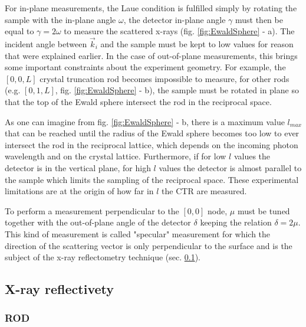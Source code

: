 For in-plane measurements, the Laue condition is fulfilled simply by rotating the sample with the in-plane angle $\omega$, the detector in-plane angle $\gamma$ must then be equal to $\gamma = 2 \omega$ to measure the scattered x-rays (fig. \ref{fig:EwaldSphere} - a).
The incident angle between $\vec{k}_i$ and the sample must be kept to low values for reason that were explained earlier.
In the case of out-of-plane measurements, this brings some important constraints about the experiment geometry.
For example, the $[0, 0, L]$ crystal truncation rod becomes impossible to measure, for other rods (e.g. $[0, 1, L]$, fig. \ref{fig:EwaldSphere} - b), the sample must be rotated in plane so that the top of the Ewald sphere intersect the rod in the reciprocal space.

As one can imagine from fig. \ref{fig:EwaldSphere} - b, there is a maximum value $l_{max}$ that can be reached until the radius of the Ewald sphere becomes too low to ever intersect the rod in the reciprocal lattice, which depends on the incoming photon wavelength and on the crystal lattice.
Furthermore, if for low $l$ values the detector is in the vertical plane, for high $l$ values the detector is almost parallel to the sample which limits the sampling of the reciprocal space.
These experimental limitations are at the origin of how far in $l$ the CTR are measured.

To perform a measurement perpendicular to the $[0, 0]$ node, $\mu$ must be tuned together with the out-of-plane angle of the detector $\delta$ keeping the relation $\delta=2\mu$.
This kind of measurement is called "specular" measurement for which the direction of the scattering vector is only perpendicular to the surface and is the subject of the x-ray reflectometry technique  (sec. \ref{XRR}).

\subsection{X-ray reflectivety}\label{XRR}


\subsubsection{ROD}
